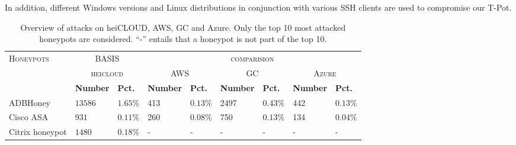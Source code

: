 In addition, different Windows versions and Linux distributions in conjunction with various SSH clients are used to compromise our T-Pot.


\begin{table}
    \centering
    \caption[Overview of attacks on cloud providers]{Overview of attacks on heiCLOUD, AWS, GC and Azure. Only the top 10 most attacked honeypots are considered. \enquote{-} entails that a honeypot is not part of the top 10.}
    \begin{tabularx}{\linewidth}{l|XX|XX|XX|XX}
        \toprule
        \textsc{Honeypots}                        & \multicolumn{2}{c}{BASIS}             & \multicolumn{6}{c}{\textsc{comparision}}                                                                                                                                             \\
                                                  & \multicolumn{2}{c|}{\textsc{heicloud}} & \multicolumn{2}{c|}{\textsc{AWS}}        & \multicolumn{2}{c|}{\textsc{GC}} & \multicolumn{2}{c}{\textsc{Azure}}                                                                     \\
                                                  & \textbf{Number}                        & \textbf{Pct.}                            & \textbf{Number}                  & \textbf{Pct.}                      & \textbf{Number} & \textbf{Pct.} & \textbf{Number} & \textbf{Pct.} \\
        \hline
        ADBHoney \cite{adbhoney2021}              & $13586$                                & $1.65\%$                                 & 413                              & $0.13\%$                           & 2497            & $0.43\%$      & 442             & $0.13\%$      \\
        Cisco ASA \cite{cymmetria2018}            & $931$                                  & $0.11\%$                                 & 260                              & $0.08\%$                           & 750             & $0.13\%$      & 134             & $0.04\%$      \\
        Citrix honeypot \cite{citrixhoneypot2020} & $1480$                                 & $0.18\%$                                 & -                                & -                                  & -               & -             & -               & -             \\

\end{tabularx}
\end{table}

